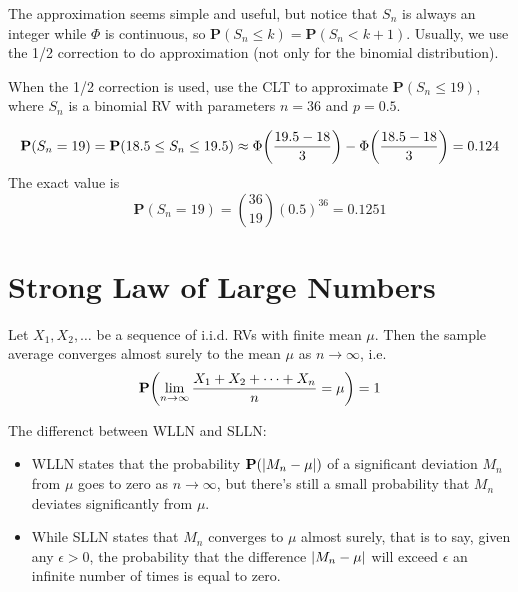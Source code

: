 \documentclass[device=normal, lang=en]{elegantbook}
\numberwithin{equation}{section}
\begin{document}
The approximation seems simple and useful, but notice that $S_n$ is always an integer while $\Phi$ is continuous, so $\mathbf{P}(S_n \leq k) = \mathbf{P}(S_n < k + 1)$. Usually, we use the 1/2 correction to do approximation (not only for the binomial distribution).
\begin{example}
    When the 1/2 correction is used, use the CLT to approximate $\mathbf{P}(S_n \leq 19)$, where $S_n$ is a binomial RV with parameters $n = 36$ and $p = 0.5$.
\end{example}
\begin{solution}
    \begin{equation}
        \mathbf{P}(S_n = 19) = \mathbf{P}(18.5 \leq S_n \leq 19.5) \approx \Phi\qty(\frac{19.5 - 18}{3}) - \Phi\qty(\frac{18.5 - 18}{3}) = 0.124
    \end{equation}
    The exact value is
    \begin{equation}
        \mathbf{P}(S_n = 19) = \binom{36}{19} (0.5)^{36} = 0.1251
    \end{equation}
\end{solution}

\section{Strong Law of Large Numbers}
\begin{theorem}
    Let $X_1, X_2, \ldots$ be a sequence of i.i.d. RVs with finite mean $\mu$. Then the sample average converges almost surely to the mean $\mu$ as $n \to \infty$, i.e.
    \begin{equation}
        \mathbf{P}\qty(\lim_{n \to \infty} \frac{X_1 + X_2 + \cdots + X_n}{n} = \mu) = 1
    \end{equation}
\end{theorem}

\begin{remark}
    The differenct between WLLN and SLLN:
    \begin{itemize}
        \item WLLN states that the probability $\mathbf{P}(\abs{M_n - \mu})$ of a significant deviation $M_n$ from $\mu$ goes to zero as $n \to \infty$, but there's still a small probability that $M_n$ deviates significantly from $\mu$.
        \item While SLLN states that $M_n$ converges to $\mu$ almost surely, that is to say, given any $\epsilon > 0$, the probability that the difference $\abs{M_n - \mu}$ will exceed $\epsilon$ an infinite number of times is equal to zero.
    \end{itemize}
\end{remark}
\end{document}
